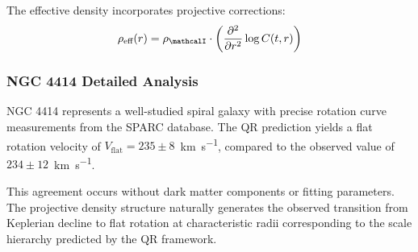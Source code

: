 The effective density incorporates projective corrections:
\begin{equation}
\rho_{\text{eff}}(r) = \rho_{\mathcalI} \cdot \left( \frac{\partial^2}{\partial r^2} \log C(t,r) \right)
\label{eq:projective-density-rotation}
\end{equation}

\subsubsection{NGC 4414 Detailed Analysis}
\label{subsubsec:ngc4414-analysis}

NGC 4414 represents a well-studied spiral galaxy with precise rotation curve measurements from the SPARC database.  
The QR prediction yields a flat rotation velocity of $V_{\text{flat}} = 235 \pm 8$~\si{\km\per\second}, compared to the observed value of $234 \pm 12$~\si{\km\per\second}.

This agreement occurs without dark matter components or fitting parameters.  
The projective density structure naturally generates the observed transition from Keplerian decline to flat rotation at characteristic radii corresponding to the scale hierarchy predicted by the QR framework.
